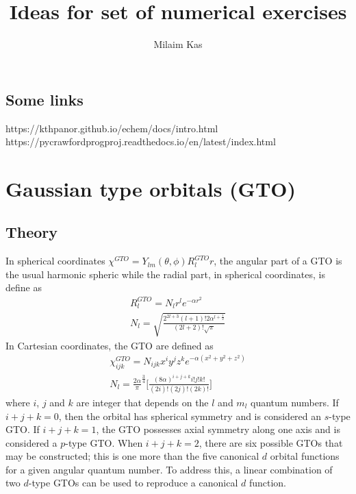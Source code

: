 \documentclass[12pt]{article}
\title{Ideas for set of numerical exercises}
\author{Milaim Kas}
\begin{document}
\maketitle

\tableofcontents

\subsection{Some links}

https://kthpanor.github.io/echem/docs/intro.html
https://pycrawfordprogproj.readthedocs.io/en/latest/index.html

\section{Gaussian type orbitals (GTO)}

\subsection{Theory}

In spherical coordinates $\chi^{GTO}=Y_{lm}(\theta,\phi)R^{GTO}_l{r}$, the angular part of a GTO is the usual harmonic spheric while the radial part, in spherical coordinates, is define as
\begin{eqnarray}
R_l^{GTO} = N_l r^l e^{-\alpha r^2} \\
N_l = \sqrt{\frac{2^{2l+3}(l+1)!2\alpha^{l+\frac{1}{2}}}{(2l+2)!\sqrt{\pi}}}
\end{eqnarray}
In Cartesian coordinates, the GTO are defined as
\begin{eqnarray}
\chi^{GTO}_{ijk} = N_{ijk} x^{i}y^{j}z^{k} e^{-\alpha (x^2+y^2+z^2)} \\
N_l = \frac{2\alpha}{\pi}^{\frac{3}{4}}\big[ \frac{(8\alpha)^{i+j+k}i!j!k!}{(2i)!(2j)!(2k)!} \big]
\end{eqnarray}
where $i$, $j$ and $k$ are integer that depends on the $l$ and $m_l$ quantum numbers. If $i + j + k = 0$, then the orbital has spherical symmetry and is considered an $s$-type GTO. If $i + j + k = 1$, the GTO possesses axial symmetry along one axis and is considered a $p$-type GTO. When $i + j + k = 2$, there are six possible GTOs that may be constructed; this is one more than the five canonical $d$ orbital functions for a given angular quantum number. To address this, a linear combination of two $d$-type GTOs can be used to reproduce a canonical $d$ function. 
\end{document}
